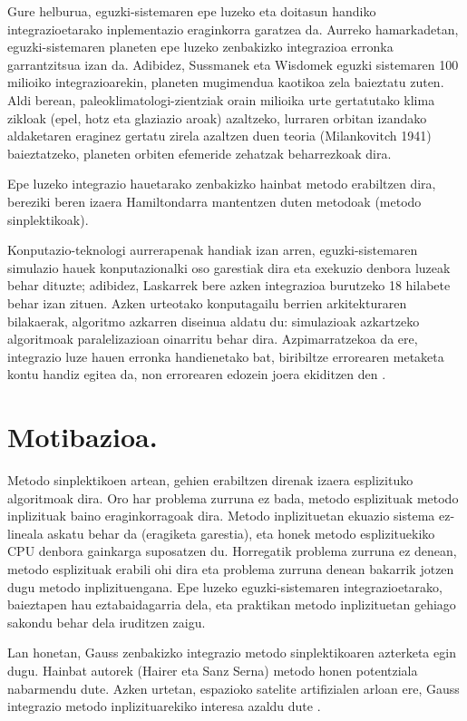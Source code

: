 Gure helburua, eguzki-sistemaren epe luzeko eta doitasun handiko integrazioetarako inplementazio eraginkorra garatzea da. Aurreko hamarkadetan, eguzki-sistemaren planeten epe luzeko zenbakizko integrazioa erronka garrantzitsua izan da. Adibidez, Sussmanek eta Wisdomek  eguzki sistemaren 100 milioiko integrazioarekin, planeten mugimendua kaotikoa zela baieztatu zuten. Aldi berean, paleoklimatologi-zientziak orain milioika urte gertatutako klima zikloak (epel, hotz eta glaziazio aroak) azaltzeko, lurraren orbitan izandako aldaketaren eraginez gertatu zirela azaltzen duen teoria (Milankovitch 1941) \cite{Berger2012} baieztatzeko, planeten orbiten efemeride zehatzak beharrezkoak dira.        

Epe luzeko integrazio hauetarako zenbakizko hainbat metodo erabiltzen dira, bereziki beren izaera Hamiltondarra mantentzen duten metodoak (metodo sinplektikoak).

Konputazio-teknologi aurrerapenak handiak izan arren, eguzki-sistemaren simulazio hauek konputazionalki oso garestiak dira eta exekuzio denbora luzeak behar dituzte; adibidez, Laskarrek  bere azken integrazioa burutzeko 18 hilabete behar izan zituen.
Azken urteotako konputagailu berrien arkitekturaren bilakaerak, algoritmo azkarren diseinua aldatu du: simulazioak azkartzeko algoritmoak paralelizazioan oinarritu behar dira. Azpimarratzekoa da ere, integrazio luze hauen erronka handienetako bat, biribiltze errorearen metaketa kontu handiz egitea da, non errorearen edozein joera ekiditzen den \cite{Laskar2015}.
 

\section{Motibazioa.}
\label{intro}


Metodo sinplektikoen artean, gehien erabiltzen direnak izaera esplizituko algoritmoak dira. Oro har problema zurruna ez bada, metodo esplizituak  metodo inplizituak baino eraginkorragoak dira. Metodo inplizituetan ekuazio sistema ez-lineala askatu behar da (eragiketa garestia), eta honek metodo esplizituekiko CPU denbora gainkarga suposatzen du. Horregatik problema zurruna ez denean, metodo esplizituak erabili ohi dira eta problema zurruna denean bakarrik jotzen dugu metodo inplizituengana. Epe luzeko eguzki-sistemaren integrazioetarako, baieztapen hau eztabaidagarria dela, eta praktikan metodo inplizituetan gehiago sakondu behar dela iruditzen zaigu. 

Lan honetan, Gauss zenbakizko integrazio metodo sinplektikoaren azterketa egin dugu. Hainbat autorek (Hairer \cite{Hairer2006}\cite{Hairer2008} eta Sanz Serna\cite{JMSanz-Serna1994}) metodo honen potentziala nabarmendu dute. Azken urtetan, espazioko satelite artifizialen arloan ere, Gauss integrazio metodo inplizituarekiko interesa azaldu dute \cite{Bradley2014}\cite{Beylkin2014}. 


